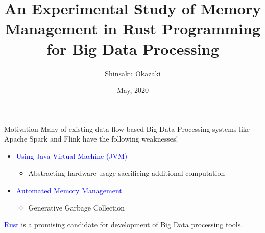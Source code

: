 \documentclass[9pt]{beamer}
\title[]{An Experimental Study of Memory Management in Rust Programming for Big Data Processing}
\date{May, 2020}
\author[Shinsaku Okazaki]{Shinsaku Okazaki}
\institute{Boston University}
\begin{document}
\maketitle








\begin{frame}[fragile]{Motivation}
Many of existing data-flow based Big Data Processing systems like Apache Spark and Flink have the following weaknesses! 
    \vspace{0.5cm}
    \begin{itemize}
        \item \textcolor{blue}{Using Java Virtual Machine (JVM)}
        \begin{itemize}
            \item Abstracting hardware usage sacrificing additional computation
        \end{itemize}
        \item \textcolor{blue}{Automated Memory Management}
        \begin{itemize}
            \item Generative Garbage Collection
        \end{itemize}
    \end{itemize}
    \vspace{0.5cm}
\textcolor{blue}{Rust} is a promising candidate for development of Big Data processing tools.



\end{frame}


\end{document}
